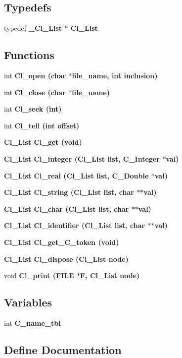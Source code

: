 \subsection*{Typedefs}
\begin{CompactItemize}
\item 
typedef \bf{\_\-Cl\_\-List} $\ast$ \bf{Cl\_\-List}
\end{CompactItemize}
\subsection*{Functions}
\begin{CompactItemize}
\item 
int \bf{Cl\_\-open} (char $\ast$file\_\-name, int inclusion)
\item 
int \bf{Cl\_\-close} (char $\ast$file\_\-name)
\item 
int \bf{Cl\_\-seek} (int)
\item 
int \bf{Cl\_\-tell} (int offset)
\item 
\bf{Cl\_\-List} \bf{Cl\_\-get} (void)
\item 
\bf{Cl\_\-List} \bf{Cl\_\-integer} (\bf{Cl\_\-List} \bf{list}, \bf{C\_\-Integer} $\ast$val)
\item 
\bf{Cl\_\-List} \bf{Cl\_\-real} (\bf{Cl\_\-List} \bf{list}, \bf{C\_\-Double} $\ast$val)
\item 
\bf{Cl\_\-List} \bf{Cl\_\-string} (\bf{Cl\_\-List} \bf{list}, char $\ast$$\ast$val)
\item 
\bf{Cl\_\-List} \bf{Cl\_\-char} (\bf{Cl\_\-List} \bf{list}, char $\ast$$\ast$val)
\item 
\bf{Cl\_\-List} \bf{Cl\_\-identifier} (\bf{Cl\_\-List} \bf{list}, char $\ast$$\ast$val)
\item 
\bf{Cl\_\-List} \bf{Cl\_\-get\_\-C\_\-token} (void)
\item 
\bf{Cl\_\-List} \bf{Cl\_\-dispose} (\bf{Cl\_\-List} \bf{node})
\item 
void \bf{Cl\_\-print} (FILE $\ast$\bf{F}, \bf{Cl\_\-List} \bf{node})
\end{CompactItemize}
\subsection*{Variables}
\begin{CompactItemize}
\item 
int \bf{C\_\-name\_\-tbl}
\end{CompactItemize}


\subsection{Define Documentation}
